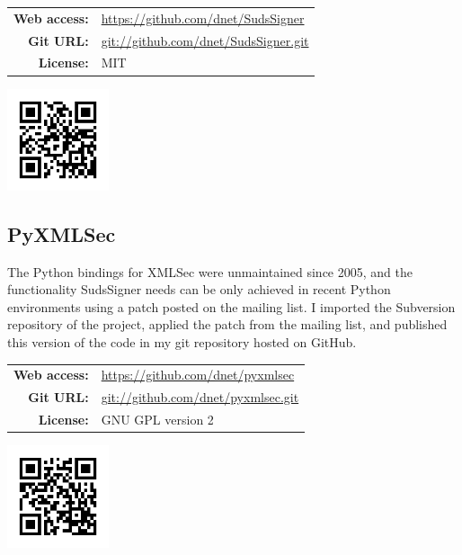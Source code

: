 \begin{center}
 \begin{minipage}[c]{0.7\linewidth}
  \begin{tabular}{rl}
   \textbf{Web access:} & \small\url{https://github.com/dnet/SudsSigner} \\
   \textbf{Git URL:} & \small\url{git://github.com/dnet/SudsSigner.git} \\
   \textbf{License:} & MIT
  \end{tabular}
 \end{minipage}
 \hspace{5mm}
 \begin{minipage}[c]{3cm}
  \includegraphics[width=3cm]{images/qr/sudsign.png}
 \end{minipage}
\end{center}

\subsection{PyXMLSec}

The Python bindings for XMLSec were unmaintained since 2005, and the functionality SudsSigner needs can be only achieved in recent Python environments using a patch posted on the mailing list. I imported the Subversion repository of the project, applied the patch from the mailing list, and published this version of the code in my git repository hosted on GitHub.

\bigskip

\begin{center}
 \begin{minipage}[c]{0.7\linewidth}
  \begin{tabular}{rl}
   \textbf{Web access:} & \small\url{https://github.com/dnet/pyxmlsec} \\
   \textbf{Git URL:} & \small\url{git://github.com/dnet/pyxmlsec.git} \\
   \textbf{License:} & GNU GPL version 2
  \end{tabular}
 \end{minipage}
 \hspace{5mm}
 \begin{minipage}[c]{3cm}
  \includegraphics[width=3cm]{images/qr/pxsec.png}
 \end{minipage}
\end{center}

